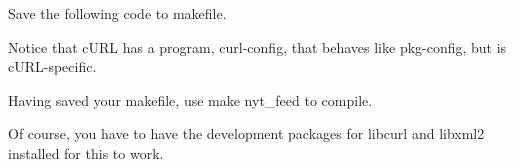 Save the following code to {\ttfamily makefile}.

Notice that c\+U\+RL has a program, {\ttfamily curl-\/config}, that behaves like {\ttfamily pkg-\/config}, but is c\+U\+R\+L-\/specific.


\begin{DoxyCode}{0}
\DoxyCodeLine{}
\end{DoxyCode}


Having saved your makefile, use {\ttfamily make nyt\+\_\+feed} to compile.

Of course, you have to have the development packages for libcurl and libxml2 installed for this to work. 